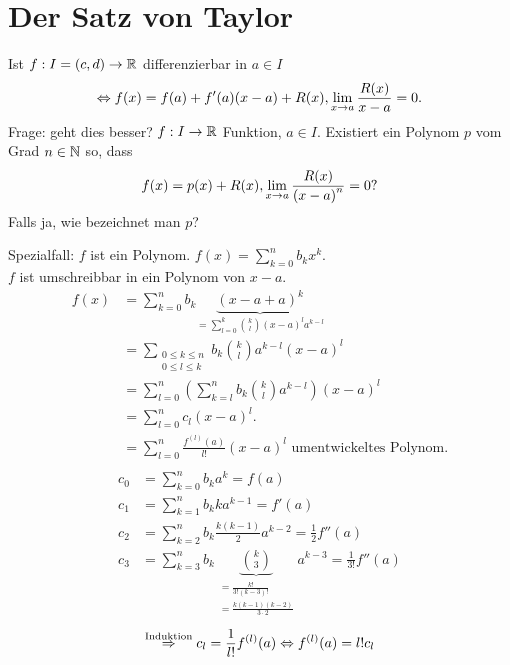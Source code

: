 \documentclass[../ana2.tex]{subfiles}
\begin{document}
\setcounter{section}{0}
\section{Der Satz von Taylor}

Ist \( f:I = (c,d)\rightarrow \mathbb{R} \) differenzierbar in 
\( a \in I \) \\
\[ \Leftrightarrow f(x) = f(a) + f'(a)(x-a) + R(x), 
\lim\limits_{x\rightarrow{}a} \frac{R(x)}{x-a} = 0. \]
Frage: geht dies besser? \( f:I\rightarrow \mathbb{R} \) 
 Funktion, \( a \in I \).
Existiert ein Polynom \( p \) vom Grad \( n\in\mathbb{N} \) 
so, dass 
\[ f(x) = p(x) + R(x), 
\lim\limits_{x\rightarrow{}a} \frac{R(x)}{{(x-a)}^n} = 0? \]
Falls ja, wie bezeichnet man \( p \)?

Spezialfall: \(f\) ist ein Polynom. 
\( f(x) = \sum_{k=0}^n b_k x^k \). \\
\( f \) ist umschreibbar in ein Polynom von \( x-a \). \\
\begin{align*}
    f(x) &= \sum_{k=0}^n b_k \underbrace{{(x - a + a)}^k}_{
        = \sum_{l=0}^k \binom{k}{l} {(x-a)}^l a^{k-l}
    } \\
    &= \sum_{\substack{0 \leq k \leq n \\ 0 \leq l \leq k}} %
    b_k \binom{k}{l} a^{k-l} {(x-a)}^l \\
    &= \sum_{l=0}^n \left( \sum_{k=l}^n 
    b_k \binom{k}{l} a^{k-l} \right) {(x-a)}^l \\
    &= \sum_{l=0}^n c_l {(x-a)}^l.\\
    &= \sum_{l=0}^n \frac{f^{(l)}(a)}{l!} {(x-a)}^l 
    \text{ umentwickeltes Polynom}. \\
\end{align*}
\begin{align*}
    c_0 &= \sum_{k=0}^n b_k a^k = f(a) \\
    c_1 &= \sum_{k=1}^n b_k k a^{k-1} = f'(a) \\
    c_2 &= \sum_{k=2}^n b_k \frac{k(k-1)}{2} a^{k-2} 
    = \frac{1}{2} f''(a) \\
    c_3 &= \sum_{k=3}^n b_k 
    \underbrace{\binom{k}{3}}_{
        \substack{= \frac{k!}{3!(k-3)!} 
        \\= \frac{k(k-1)(k-2)}{3 \cdot 2} }
    } a^{k-3}
    = \frac{1}{3!} f''(a)
\end{align*}
\[ \overset{\text{Induktion}}{\Rightarrow} c_l 
= \frac{1}{l!} f^{(l)}(a) 
\Leftrightarrow f^{(l)}(a) = l!c_l \]
\end{document}
